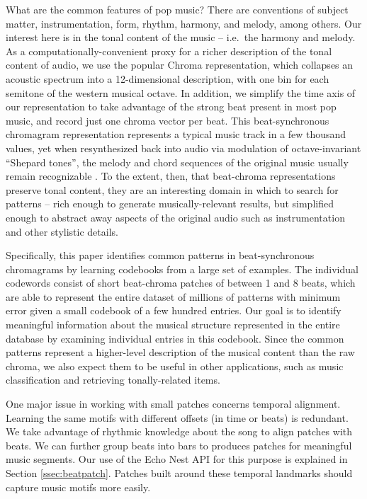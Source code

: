 \documentclass{article}
\newcommand{\ie}{i.e.~}
\begin{document}
What are the common features of pop music?  There are conventions
of subject matter, instrumentation, form, rhythm, harmony, and melody, among
others.  Our interest here is in the tonal content of the music -- \ie the
harmony and melody.  As a computationally-convenient proxy for a richer
description of the tonal content of audio, we use the popular Chroma
representation, which collapses an acoustic spectrum into a 12-dimensional
description, with one bin for each semitone of the western musical octave.
In addition, we simplify the time axis of our representation to take advantage
of the strong beat present in most pop music, and record just one
chroma vector per beat.  This beat-synchronous chromagram
representation represents a typical music track
in a few thousand values, yet when resynthesized back into audio via
modulation of octave-invariant ``Shepard tones'', the melody and
chord sequences of the original music usually remain recognizable
\cite{Ellis2007a_small}.  To the extent, then, that beat-chroma
representations preserve tonal content, they
are an interesting domain in which to search for patterns -- rich enough
to generate musically-relevant results, but simplified enough to
abstract away aspects of the original audio such as
instrumentation and other stylistic details.

Specifically, this paper identifies common patterns in beat-synchronous
chromagrams by learning codebooks from a large set of examples.
The individual codewords consist of short beat-chroma patches of
between 1 and 8 beats, which are able to represent the entire dataset
of millions of patterns with minimum error given a small codebook of
a few hundred entries.  Our goal is to identify meaningful information
about the musical structure represented in the entire database by
examining individual entries in this codebook.  Since the common
patterns represent a higher-level description of the musical content
than the raw chroma,
we also expect them to be useful in other applications, such as
music classification and retrieving tonally-related items.

One major issue in working with small patches concerns temporal
alignment. Learning the same motifs with different offsets 
(in time or beats) is redundant. We take advantage
of rhythmic knowledge about the song to align patches with beats.
We can further group beats into bars to produces patches
for meaningful music segments.
Our use of the Echo Nest API \cite{EchoNest} for this purpose is 
explained in Section \ref{ssec:beatpatch}. Patches built around
these temporal landmarks should capture music motifs more easily.
\end{document}
